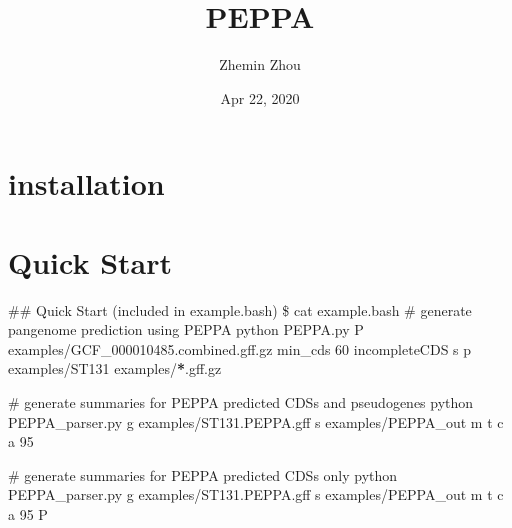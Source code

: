 \documentclass[letterpaper,10pt,english]{sphinxmanual}
\title{PEPPA}
\date{Apr 22, 2020}
\author{Zhemin Zhou}
\begin{document}
\pagestyle{empty}
\sphinxmaketitle
\pagestyle{plain}
\sphinxtableofcontents
\pagestyle{normal}
\label{\detokenize{index::doc}}



\chapter{installation}
\label{\detokenize{usage/installation:installation}}\label{\detokenize{usage/installation::doc}}

\chapter{Quick Start}
\label{\detokenize{usage/quickstart:quick-start}}\label{\detokenize{usage/quickstart::doc}}
\#\# Quick Start (included in example.bash)
{\color{red}\bfseries{}\textasciigrave{}\textasciigrave{}}\textasciigrave{}
\$ cat example.bash
\# generate pan\sphinxhyphen{}genome prediction using PEPPA
python PEPPA.py \sphinxhyphen{}P examples/GCF\_000010485.combined.gff.gz \textendash{}min\_cds 60 \textendash{}incompleteCDS s \sphinxhyphen{}p examples/ST131 examples/{\color{red}\bfseries{}*}.gff.gz

\# generate summaries for PEPPA predicted CDSs and pseudogenes
python PEPPA\_parser.py \sphinxhyphen{}g examples/ST131.PEPPA.gff \sphinxhyphen{}s examples/PEPPA\_out \sphinxhyphen{}m \sphinxhyphen{}t \sphinxhyphen{}c \sphinxhyphen{}a 95

\# generate summaries for PEPPA predicted CDSs only
python PEPPA\_parser.py \sphinxhyphen{}g examples/ST131.PEPPA.gff \sphinxhyphen{}s examples/PEPPA\_out \sphinxhyphen{}m \sphinxhyphen{}t \sphinxhyphen{}c \sphinxhyphen{}a 95 \sphinxhyphen{}P
{\color{red}\bfseries{}\textasciigrave{}\textasciigrave{}}{\color{red}\bfseries{}\textasciigrave{}}
\end{document}
